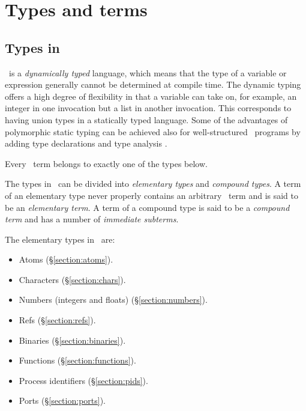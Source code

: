 %
%
%
%
%
%
%

\chapter{Types and terms}

\label{chapter:types-terms}

\section{Types in \Erlang}

\Erlang\ is a \emph{dynamically typed} language, which means that the
type of a variable or expression generally cannot be determined at
compile time.  The dynamic typing offers a high degree of flexibility
in that a variable can take on, for example, an integer in one
invocation but a list in another invocation.  This corresponds to
having union types in a statically typed language.  Some of the
advantages of polymorphic static typing can be achieved also for
well-structured \Erlang\ programs by adding type declarations and type
analysis \cite{erltc}.

Every \Erlang\ term belongs to exactly one of the types below.

The types in \Erlang\ can be divided into \emph{elementary types} and
\emph{compound types}.  A term of an elementary type never properly
contains an arbitrary \Erlang\ term and is said to be an
\emph{elementary term}.  A term of a compound type is said to be a
\emph{compound term} and has a number of
\emph{immediate subterms}.

The elementary types in \Erlang\ are:
\begin{itemize}
\item Atoms (\S\ref{section:atoms}).
\ifStd
\item Characters (\S\ref{section:chars}).
\fi
\item Numbers (integers and floats) (\S\ref{section:numbers}).
\item Refs (\S\ref{section:refs}).
\item Binaries (\S\ref{section:binaries}).
\ifStd
\item Functions (\S\ref{section:functions}).
\fi
\item Process identifiers (\S\ref{section:pids}).
\item Ports (\S\ref{section:ports}).
\end{itemize}

